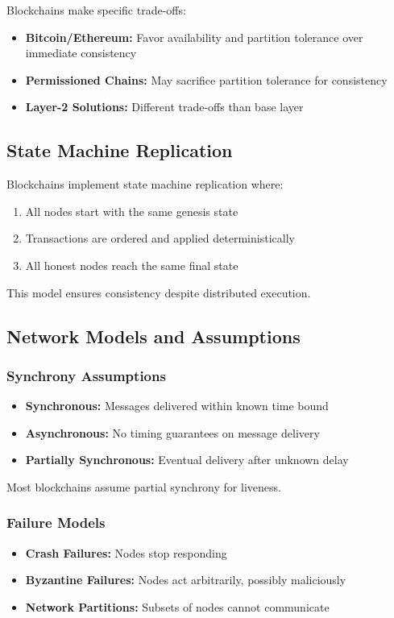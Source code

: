 Blockchains make specific trade-offs:
\begin{itemize}
    \item \textbf{Bitcoin/Ethereum:} Favor availability and partition tolerance over immediate consistency
    \item \textbf{Permissioned Chains:} May sacrifice partition tolerance for consistency
    \item \textbf{Layer-2 Solutions:} Different trade-offs than base layer
\end{itemize}

\subsection{State Machine Replication}

Blockchains implement state machine replication where:
\begin{enumerate}
    \item All nodes start with the same genesis state
    \item Transactions are ordered and applied deterministically
    \item All honest nodes reach the same final state
\end{enumerate}

This model ensures consistency despite distributed execution.

\subsection{Network Models and Assumptions}

\subsubsection{Synchrony Assumptions}
\begin{itemize}
    \item \textbf{Synchronous:} Messages delivered within known time bound
    \item \textbf{Asynchronous:} No timing guarantees on message delivery
    \item \textbf{Partially Synchronous:} Eventual delivery after unknown delay
\end{itemize}

Most blockchains assume partial synchrony for liveness.

\subsubsection{Failure Models}
\begin{itemize}
    \item \textbf{Crash Failures:} Nodes stop responding
    \item \textbf{Byzantine Failures:} Nodes act arbitrarily, possibly maliciously
    \item \textbf{Network Partitions:} Subsets of nodes cannot communicate
\end{itemize}

